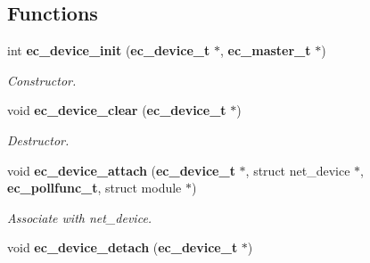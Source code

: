 \subsection*{\-Functions}
\begin{DoxyCompactItemize}
\item 
int {\bf ec\-\_\-device\-\_\-init} ({\bf ec\-\_\-device\-\_\-t} $\ast$, {\bf ec\-\_\-master\-\_\-t} $\ast$)
\begin{DoxyCompactList}\small\item\em \-Constructor. \end{DoxyCompactList}\item 
void {\bf ec\-\_\-device\-\_\-clear} ({\bf ec\-\_\-device\-\_\-t} $\ast$)\label{device_8h_a3099aa0e5bfa03897b85f4b542108d87}

\begin{DoxyCompactList}\small\item\em \-Destructor. \end{DoxyCompactList}\item 
void {\bf ec\-\_\-device\-\_\-attach} ({\bf ec\-\_\-device\-\_\-t} $\ast$, struct net\-\_\-device $\ast$, {\bf ec\-\_\-pollfunc\-\_\-t}, struct module $\ast$)\label{device_8h_a7f14ad3873acec6c4aab27a403b86e2f}

\begin{DoxyCompactList}\small\item\em \-Associate with net\-\_\-device. \end{DoxyCompactList}\item 
void {\bf ec\-\_\-device\-\_\-detach} ({\bf ec\-\_\-device\-\_\-t} $\ast$)\label{device_8h_a6aa86617de7ed991048e151847683a01}


\end{DoxyCompactItemize}
